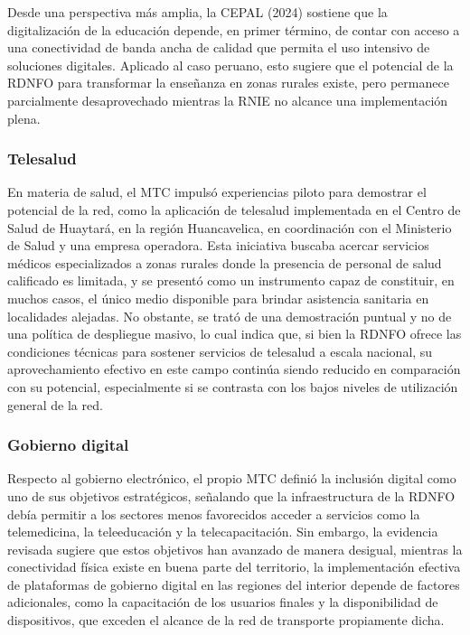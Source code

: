 Desde una perspectiva más amplia, la CEPAL (2024) sostiene que la digitalización de la educación depende, en primer término, de contar con acceso a una conectividad de banda ancha de calidad que permita el uso intensivo de soluciones digitales. Aplicado al caso peruano, esto sugiere que el potencial de la RDNFO para transformar la enseñanza en zonas rurales existe, pero permanece parcialmente desaprovechado mientras la RNIE no alcance una implementación plena.

\subsubsection{Telesalud}
En materia de salud, el MTC impulsó experiencias piloto para demostrar el potencial de la red, como la aplicación de telesalud implementada en el Centro de Salud de Huaytará, en la región Huancavelica, en coordinación con el Ministerio de Salud y una empresa operadora. Esta iniciativa buscaba acercar servicios médicos especializados a zonas rurales donde la presencia de personal de salud calificado es limitada, y se presentó como un instrumento capaz de constituir, en muchos casos, el único medio disponible para brindar asistencia sanitaria en localidades alejadas. No obstante, se trató de una demostración puntual y no de una política de despliegue masivo, lo cual indica que, si bien la RDNFO ofrece las condiciones técnicas para sostener servicios de telesalud a escala nacional, su aprovechamiento efectivo en este campo continúa siendo reducido en comparación con su potencial, especialmente si se contrasta con los bajos niveles de utilización general de la red.

\subsubsection{Gobierno digital}
Respecto al gobierno electrónico, el propio MTC definió la inclusión digital como uno de sus objetivos estratégicos, señalando que la infraestructura de la RDNFO debía permitir a los sectores menos favorecidos acceder a servicios como la telemedicina, la teleeducación y la telecapacitación. Sin embargo, la evidencia revisada sugiere que estos objetivos han avanzado de manera desigual, mientras la conectividad física existe en buena parte del territorio, la implementación efectiva de plataformas de gobierno digital en las regiones del interior depende de factores adicionales, como la capacitación de los usuarios finales y la disponibilidad de dispositivos, que exceden el alcance de la red de transporte propiamente dicha.

